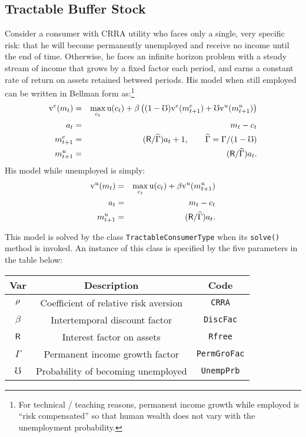\documentclass[12pt,titlepage,letterpaper]{econtex}
\begin{document}
\subsection{Tractable Buffer Stock}

Consider a consumer with CRRA utility who faces only a single, very specific risk: that he will become permanently unemployed and receive no income until the end of time.  Otherwise, he faces an infinite horizon problem with a steady stream of income that grows by a fixed factor each period, and earns a constant rate of return on assets retained betweed periods.  His model when still employed can be written in Bellman form as:\footnote{For technical / teaching reasons, permanent income growth while employed is ``risk compensated'' so that human wealth does not vary with the unemployment probability.}
\begin{eqnarray*}
\mathrm{v}^e(m_t) &=& \max_{c_t} \mathrm{u}(c_t) + \beta  \left( (1-\mho)\mathrm{v}^e(m^e_{t+1}) + \mho \mathrm{v}^u(m^u_{t+1}) \right) \\
a_t &=& m_t - c_t \\
m^e_{t+1} &=& (\mathsf{R}/\widehat{\Gamma}) a_t + 1, \qquad \widehat{\Gamma} = \Gamma/(1-\mho)\\
m^u_{t+1} &=& (\mathsf{R}/\widehat{\Gamma}) a_t.
\end{eqnarray*}
His model while unemployed is simply:
\begin{eqnarray*}
\mathrm{v}^u(m_t) &=& \max_{c_t} \mathrm{u}(c_t) + \beta  \mathrm{v}^u(m^u_{t+1}) \\
a_t &=& m_t - c_t \\
m^u_{t+1} &=& (\mathsf{R}/\widehat{\Gamma}) a_t.
\end{eqnarray*}

This model is solved by the class \texttt{TractableConsumerType} when its \texttt{solve()} method is invoked.  An instance of this class is specified by the five parameters in the table below:
\begin{table}[h!]
\centering
\begin{tabular}{c c c}
Var & Description & Code \\
\hline
$\rho$ & Coefficient of relative risk aversion & \texttt{CRRA} \\
$\beta$ & Intertemporal discount factor & \texttt{DiscFac} \\
$\mathsf{R}$ & Interest factor on assets & \texttt{Rfree} \\
$\Gamma$ & Permanent income growth factor & \texttt{PermGroFac} \\
$\mho$ & Probability of becoming unemployed & \texttt{UnempPrb} \\
\end{tabular}
\end{table}
\end{document}
